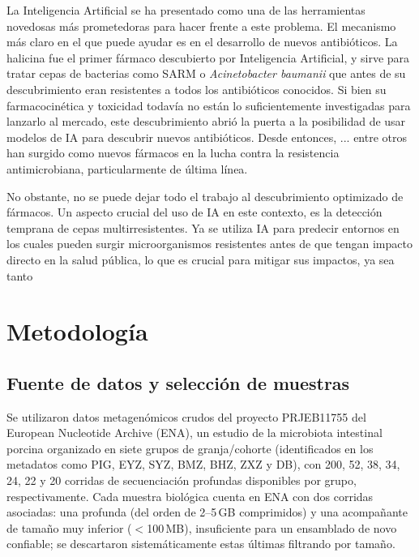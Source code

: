 \documentclass[journal]{vgtc}                     %
\begin{document}
La Inteligencia Artificial se ha presentado como una de las herramientas novedosas más prometedoras para hacer frente a este problema. El mecanismo más claro en el que puede ayudar es en el desarrollo de nuevos antibióticos. La halicina fue el primer fármaco descubierto por Inteligencia Artificial, y sirve para tratar cepas de bacterias como SARM o \textit{Acinetobacter baumanii} que antes de su descubrimiento eran resistentes a todos los antibióticos conocidos. Si bien su farmacocinética y toxicidad todavía no están lo suficientemente investigadas para lanzarlo al mercado, este descubrimiento abrió la puerta a la posibilidad de usar modelos de IA para descubrir nuevos antibióticos. Desde entonces, ... entre otros han surgido como nuevos fármacos en la lucha contra la resistencia antimicrobiana, particularmente de última línea.

No obstante, no se puede dejar todo el trabajo al descubrimiento optimizado de fármacos. Un aspecto crucial del uso de IA en este contexto, es la detección temprana de cepas multirresistentes. Ya se utiliza IA para predecir entornos en los cuales pueden surgir microorganismos resistentes antes de que tengan impacto directo en la salud pública, lo que es crucial para mitigar sus impactos, ya sea tanto 

\section{Metodología}

\subsection{Fuente de datos y selección de muestras}

Se utilizaron datos metagenómicos crudos del proyecto PRJEB11755 del European Nucleotide Archive (ENA), un estudio de la microbiota intestinal porcina organizado en siete grupos de granja/cohorte (identificados en los metadatos como PIG, EYZ, SYZ, BMZ, BHZ, ZXZ y DB), con 200, 52, 38, 34, 24, 22 y 20 corridas de secuenciación profundas disponibles por grupo, respectivamente. Cada muestra biológica cuenta en ENA con dos corridas asociadas: una profunda (del orden de 2--5\,GB comprimidos) y una acompañante de tamaño muy inferior ($<$100\,MB), insuficiente para un ensamblado de novo confiable; se descartaron sistemáticamente estas últimas filtrando por tamaño.
\end{document}
